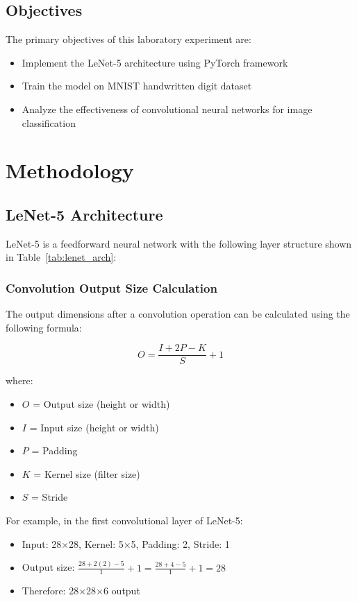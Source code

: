 \documentclass[a4paper, journal]{IEEEtran}
\begin{document}
\subsection{Objectives}

The primary objectives of this laboratory experiment are:
\begin{itemize}
    \item Implement the LeNet-5 architecture using PyTorch framework
    \item Train the model on MNIST handwritten digit dataset
    \item Analyze the effectiveness of convolutional neural networks for image classification
\end{itemize}

\section{Methodology}

\subsection{LeNet-5 Architecture}

LeNet-5 is a feedforward neural network with the following layer structure shown in Table~\ref{tab:lenet_arch}:

\subsubsection{Convolution Output Size Calculation}

The output dimensions after a convolution operation can be calculated using the following formula:

\begin{equation}
    O = \frac{I + 2P - K}{S} + 1
\end{equation}

where:
\begin{itemize}
    \item $O$ = Output size (height or width)
    \item $I$ = Input size (height or width)
    \item $P$ = Padding
    \item $K$ = Kernel size (filter size)
    \item $S$ = Stride
\end{itemize}

For example, in the first convolutional layer of LeNet-5:
\begin{itemize}
    \item Input: 28×28, Kernel: 5×5, Padding: 2, Stride: 1
    \item Output size: $\frac{28 + 2(2) - 5}{1} + 1 = \frac{28 + 4 - 5}{1} + 1 = 28$
    \item Therefore: 28×28×6 output
\end{itemize}
\end{document}
